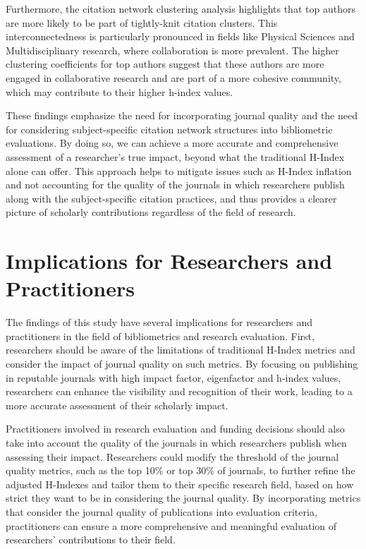 Furthermore, the citation network clustering analysis highlights that top
authors are more likely to be part of tightly-knit citation clusters. This
interconnectedness is particularly pronounced in fields like Physical Sciences
and Multidisciplinary research, where collaboration is more prevalent. The
higher clustering coefficients for top authors suggest that these authors are
more engaged in collaborative research and are part of a more cohesive
community, which may contribute to their higher h-index values.

These findings emphasize the need for incorporating journal quality and the
need for considering subject-specific citation network structures into
bibliometric evaluations. By doing so, we can achieve a more accurate and
comprehensive assessment of a researcher's true impact, beyond what the
traditional H-Index alone can offer. This approach helps to mitigate issues
such as H-Index inflation and not accounting for the quality of the journals in
which researchers publish along with the subject-specific citation practices,
and thus provides a clearer picture of scholarly contributions regardless of
the field of research.

\section{Implications for Researchers and Practitioners}

The findings of this study have several implications for researchers and
practitioners in the field of bibliometrics and research evaluation. First,
researchers should be aware of the limitations of traditional H-Index metrics
and consider the impact of journal quality on such metrics. By focusing on
publishing in reputable journals with high impact factor, eigenfactor and
h-index values, researchers can enhance the visibility and recognition of their
work, leading to a more accurate assessment of their scholarly impact.

Practitioners involved in research evaluation and funding decisions should also
take into account the quality of the journals in which researchers publish when
assessing their impact. Researchers could modify the threshold of the journal
quality metrics, such as the top 10\% or top 30\% of journals, to further
refine the adjusted H-Indexes and tailor them to their specific research field,
based on how strict they want to be in considering the journal quality. By
incorporating metrics that consider the journal quality of publications into
evaluation criteria, practitioners can ensure a more comprehensive and
meaningful evaluation of researchers' contributions to their field.


